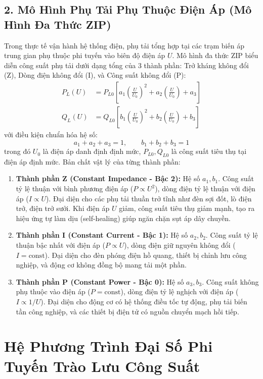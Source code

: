 \documentclass[12pt,a4paper,oneside]{report}
\begin{document}
\subsection{2. Mô Hình Phụ Tải Phụ Thuộc Điện Áp (Mô Hình Đa Thức ZIP)}
Trong thực tế vận hành hệ thống điện, phụ tải tổng hợp tại các trạm biến áp trung gian phụ thuộc phi tuyến vào biên độ điện áp $U$. Mô hình đa thức ZIP biểu diễn công suất phụ tải dưới dạng tổng của 3 thành phần: Trở kháng không đổi (Z), Dòng điện không đổi (I), và Công suất không đổi (P):
\begin{align}
P_L(U) &= P_{L0} \left[ a_1 \left( \frac{U}{U_0} \right)^2 + a_2 \left( \frac{U}{U_0} \right) + a_3 \right] \\
Q_L(U) &= Q_{L0} \left[ b_1 \left( \frac{U}{U_0} \right)^2 + b_2 \left( \frac{U}{U_0} \right) + b_3 \right]
\end{align}
với điều kiện chuẩn hóa hệ số:
\begin{equation}
a_1 + a_2 + a_3 = 1, \qquad b_1 + b_2 + b_3 = 1
\end{equation}
trong đó $U_0$ là điện áp danh định định mức, $P_{L0}, Q_{L0}$ là công suất tiêu thụ tại điện áp định mức. Bản chất vật lý của từng thành phần:
\begin{enumerate}
    \item \textbf{Thành phần Z (Constant Impedance - Bậc 2):} Hệ số $a_1, b_1$. Công suất tỷ lệ thuận với bình phương điện áp ($P \propto U^2$), dòng điện tỷ lệ thuận với điện áp ($I \propto U$). Đại diện cho các phụ tải thuần trở tĩnh như đèn sợi đốt, lò điện trở, điện trở sưởi. Khi điện áp $U$ giảm, công suất tiêu thụ giảm mạnh, tạo ra hiệu ứng tự làm dịu (self-healing) giúp ngăn chặn sụt áp dây chuyền.
    \item \textbf{Thành phần I (Constant Current - Bậc 1):} Hệ số $a_2, b_2$. Công suất tỷ lệ thuận bậc nhất với điện áp ($P \propto U$), dòng điện giữ nguyên không đổi ($I = \text{const}$). Đại diện cho đèn phóng điện hồ quang, thiết bị chỉnh lưu công nghiệp, và động cơ không đồng bộ mang tải một phần.
    \item \textbf{Thành phần P (Constant Power - Bậc 0):} Hệ số $a_3, b_3$. Công suất không phụ thuộc vào điện áp ($P = \text{const}$), dòng điện tỷ lệ nghịch với điện áp ($I \propto 1/U$). Đại diện cho động cơ có hệ thống điều tốc tự động, phụ tải biến tần công nghiệp, và các thiết bị điện tử có nguồn chuyển mạch hồi tiếp.
\end{enumerate}

\section{Hệ Phương Trình Đại Số Phi Tuyến Trào Lưu Công Suất}
\end{document}
